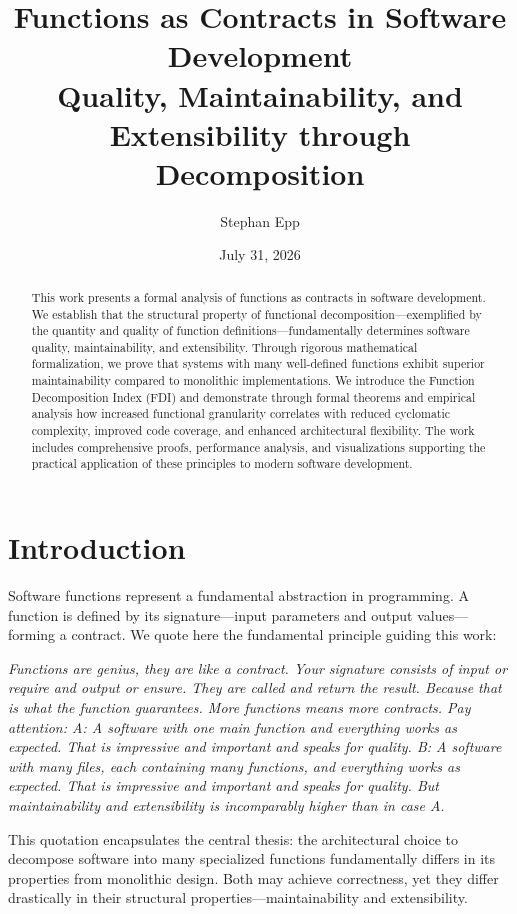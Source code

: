 \documentclass[a4paper,12pt]{article}
\title{Functions as Contracts in Software Development \\{\Large Quality, Maintainability, and Extensibility through Decomposition}}
\author{Stephan Epp}
\date{July 31, 2026}
\theoremstyle{definition}
\begin{document}
	
\maketitle

\begin{abstract}
This work presents a formal analysis of functions as contracts in software development. We establish that the structural property of functional decomposition—exemplified by the quantity and quality of function definitions—fundamentally determines software quality, maintainability, and extensibility. Through rigorous mathematical formalization, we prove that systems with many well-defined functions exhibit superior maintainability compared to monolithic implementations. We introduce the Function Decomposition Index (FDI) and demonstrate through formal theorems and empirical analysis how increased functional granularity correlates with reduced cyclomatic complexity, improved code coverage, and enhanced architectural flexibility. The work includes comprehensive proofs, performance analysis, and visualizations supporting the practical application of these principles to modern software development.
\end{abstract}

\tableofcontents
\newpage

\section{Introduction}

Software functions represent a fundamental abstraction in programming. A function is defined by its signature—input parameters and output values—forming a contract. We quote here the fundamental principle guiding this work:

\textit{Functions are genius, they are like a contract. Your signature consists of input or require and output or ensure. They are called and return the result. Because that is what the function guarantees. More functions means more contracts. Pay attention: A: A software with one main function and everything works as expected. That is impressive and important and speaks for quality. B: A software with many files, each containing many functions, and everything works as expected. That is impressive and important and speaks for quality. But maintainability and extensibility is incomparably higher than in case A.}

This quotation encapsulates the central thesis: the architectural choice to decompose software into many specialized functions fundamentally differs in its properties from monolithic design. Both may achieve correctness, yet they differ drastically in their structural properties—maintainability and extensibility.
\end{document}

